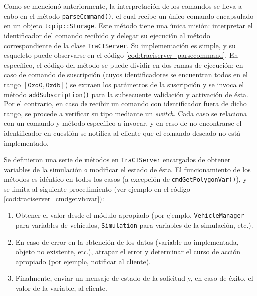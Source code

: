 Como se mencionó anteriormente, la interpretación de los comandos se lleva a cabo en el método \texttt{parseCommand()}, el cual recibe un único comando encapsulado en un objeto \texttt{tcpip::Storage}. Este método tiene una única misión: interpretar el identificador del comando recibido y delegar su ejecución al método correspondiente de la clase \texttt{TraCIServer}. Su implementación es simple, y su esqueleto puede observarse en el código \ref{cod:traciserver_parsecommand}. En específico, el código del método se puede dividir en dos ramas de ejecución; en caso de comando de suscripción (cuyos identificadores se encuentran todos en el rango $[\texttt{0xd0}, \texttt{0xdb}]$) se extraen los parámetros de la suscripción y se invoca el método \texttt{addSubscription()} para la subsecuente validación y activación de ésta. Por el contrario, en caso de recibir un comando con identificador fuera de dicho rango, se procede a verificar su tipo mediante un \emph{switch}. Cada caso se relaciona con un comando y método específico a invocar, y en caso de no encontrarse el identificador en cuestión se notifica al cliente que el comando deseado no está implementado.



Se definieron una serie de métodos en \texttt{TraCIServer} encargados de obtener variables de la simulación o modificar el estado de ésta. El funcionamiento de los métodos es idéntico en todos los casos (a excepción de \texttt{cmdGetPolygonVar()}), y se limita al siguiente procedimiento (ver ejemplo en el código \ref{cod:traciserver_cmdgetvhcvar}):

\begin{enumerate}
    \item Obtener el valor desde el módulo apropiado (por ejemplo, \texttt{VehicleManager} para variables de vehículos, \texttt{Simulation} para variables de la simulación, etc.).
    \item En caso de error en la obtención de los datos (variable no implementada, objeto no existente, etc.), atrapar el error y determinar el curso de acción apropiado (por ejemplo, notificar al cliente).
    \item Finalmente, enviar un mensaje de estado de la solicitud y, en caso de éxito, el valor de la variable, al cliente.
\end{enumerate}



